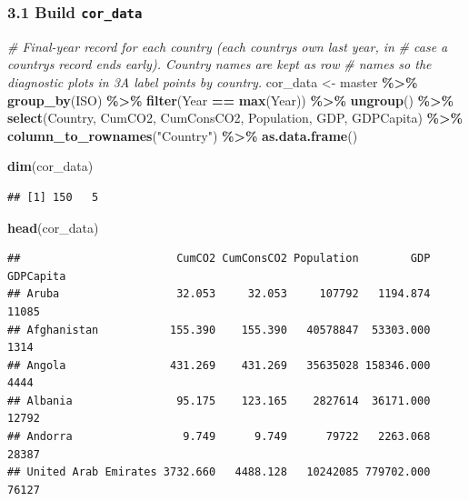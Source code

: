 \documentclass[
]{article}
\newenvironment{Shaded}{\begin{snugshade}}{\end{snugshade}}
\newcommand{\CommentTok}[1]{\textcolor[rgb]{0.56,0.35,0.01}{\textit{#1}}}
\newcommand{\FunctionTok}[1]{\textcolor[rgb]{0.13,0.29,0.53}{\textbf{#1}}}
\newcommand{\NormalTok}[1]{#1}
\newcommand{\OtherTok}[1]{\textcolor[rgb]{0.56,0.35,0.01}{#1}}
\newcommand{\SpecialCharTok}[1]{\textcolor[rgb]{0.81,0.36,0.00}{\textbf{#1}}}
\newcommand{\StringTok}[1]{\textcolor[rgb]{0.31,0.60,0.02}{#1}}
\begin{document}
\subsubsection{\texorpdfstring{3.1 Build
\texttt{cor\_data}}{3.1 Build cor\_data}}\label{build-cor_data}

\begin{Shaded}
\begin{Highlighting}[]
\CommentTok{\# Final{-}year record for each country (each country\textquotesingle{}s own last year, in}
\CommentTok{\# case a country\textquotesingle{}s record ends early). Country names are kept as row}
\CommentTok{\# names so the diagnostic plots in 3A label points by country.}
\NormalTok{cor\_data }\OtherTok{\textless{}{-}}\NormalTok{ master }\SpecialCharTok{\%\textgreater{}\%}
  \FunctionTok{group\_by}\NormalTok{(ISO) }\SpecialCharTok{\%\textgreater{}\%}
  \FunctionTok{filter}\NormalTok{(Year }\SpecialCharTok{==} \FunctionTok{max}\NormalTok{(Year)) }\SpecialCharTok{\%\textgreater{}\%}
  \FunctionTok{ungroup}\NormalTok{() }\SpecialCharTok{\%\textgreater{}\%}
  \FunctionTok{select}\NormalTok{(Country, CumCO2, CumConsCO2, Population, GDP, GDPCapita) }\SpecialCharTok{\%\textgreater{}\%}
  \FunctionTok{column\_to\_rownames}\NormalTok{(}\StringTok{"Country"}\NormalTok{) }\SpecialCharTok{\%\textgreater{}\%}
  \FunctionTok{as.data.frame}\NormalTok{()}

\FunctionTok{dim}\NormalTok{(cor\_data)}
\end{Highlighting}
\end{Shaded}

\begin{verbatim}
## [1] 150   5
\end{verbatim}

\begin{Shaded}
\begin{Highlighting}[]
\FunctionTok{head}\NormalTok{(cor\_data)}
\end{Highlighting}
\end{Shaded}

\begin{verbatim}
##                        CumCO2 CumConsCO2 Population        GDP GDPCapita
## Aruba                  32.053     32.053     107792   1194.874     11085
## Afghanistan           155.390    155.390   40578847  53303.000      1314
## Angola                431.269    431.269   35635028 158346.000      4444
## Albania                95.175    123.165    2827614  36171.000     12792
## Andorra                 9.749      9.749      79722   2263.068     28387
## United Arab Emirates 3732.660   4488.128   10242085 779702.000     76127
\end{verbatim}
\end{document}
